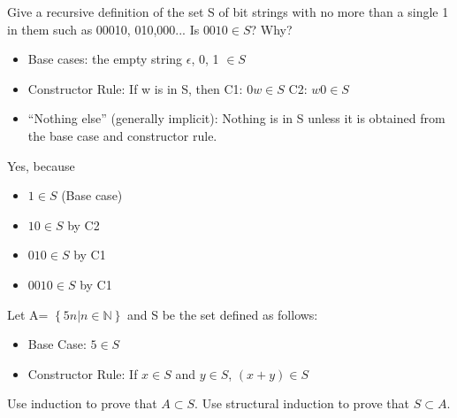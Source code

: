 \documentclass[solution, letterpaper]{cs20}
\begin{document}


\subproblem Give a recursive definition of the set S of bit strings with no more than a single 1 in them such as 00010, 010,000...
\subproblem Is $0010\in S$? Why?

\begin{solution}
\subsolution
\begin{itemize}
\item Base cases: the empty string $\epsilon$, 0, 1 $\in S$
\item Constructor Rule: If w is in S, then
\subitem C1: $0w\in S$
\subitem C2: $w0\in S$
\item “Nothing else” (generally implicit): Nothing is in S unless it is obtained from the base case and constructor rule.
\end{itemize}
\subsolution Yes, because
\begin{itemize}
\item $1\in S$ (Base case)
\item $10\in S$ by C2 
\item $010\in S$ by C1
\item $0010\in S$ by C1
\end{itemize}
\end{solution}

Let A= $\left\{ {5n|n\in\mathbb{N}}\right\}$ and S be the set defined as follows:
\begin{itemize}
\item Base Case: $5 \in S$
\item Constructor Rule: If $x\in S$ and $y\in S$, $(x+y) \in S$ 
\end{itemize}
\subproblem Use induction to prove that $A\subset S $.
\subproblem Use structural induction to prove that $S\subset A$.
\end{document}
